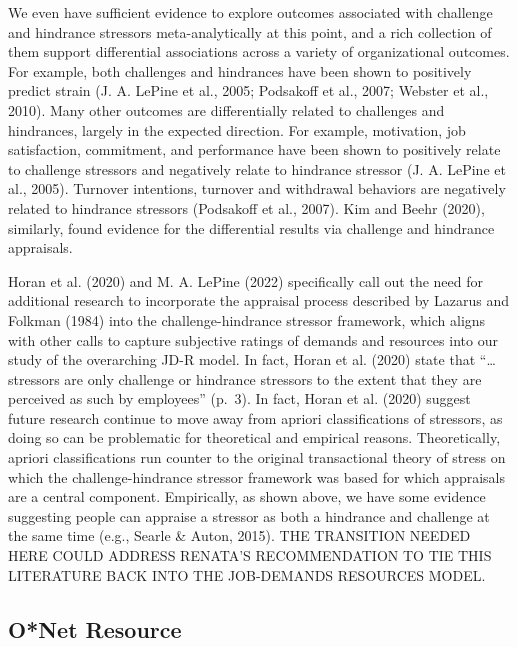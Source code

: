 \documentclass[
  english,
  man]{apa6}
\begin{document}
We even have sufficient evidence to explore outcomes associated with challenge and hindrance stressors meta-analytically at this point, and a rich collection of them support differential associations across a variety of organizational outcomes. For example, both challenges and hindrances have been shown to positively predict strain (J. A. LePine et al., 2005; Podsakoff et al., 2007; Webster et al., 2010). Many other outcomes are differentially related to challenges and hindrances, largely in the expected direction. For example, motivation, job satisfaction, commitment, and performance have been shown to positively relate to challenge stressors and negatively relate to hindrance stressor (J. A. LePine et al., 2005). Turnover intentions, turnover and withdrawal behaviors are negatively related to hindrance stressors (Podsakoff et al., 2007). Kim and Beehr (2020), similarly, found evidence for the differential results via challenge and hindrance appraisals.

Horan et al. (2020) and M. A. LePine (2022) specifically call out the need for additional research to incorporate the appraisal process described by Lazarus and Folkman (1984) into the challenge-hindrance stressor framework, which aligns with other calls to capture subjective ratings of demands and resources into our study of the overarching JD-R model. In fact, Horan et al. (2020) state that ``\ldots stressors are only challenge or hindrance stressors to the extent that they are perceived as such by employees'' (p.~3). In fact, Horan et al. (2020) suggest future research continue to move away from apriori classifications of stressors, as doing so can be problematic for theoretical and empirical reasons. Theoretically, apriori classifications run counter to the original transactional theory of stress on which the challenge-hindrance stressor framework was based for which appraisals are a central component. Empirically, as shown above, we have some evidence suggesting people can appraise a stressor as both a hindrance and challenge at the same time (e.g., Searle \& Auton, 2015). THE TRANSITION NEEDED HERE COULD ADDRESS RENATA'S RECOMMENDATION TO TIE THIS LITERATURE BACK INTO THE JOB-DEMANDS RESOURCES MODEL.

\hypertarget{onet-resource}{%
\subsection{O*Net Resource}\label{onet-resource}}
\end{document}
